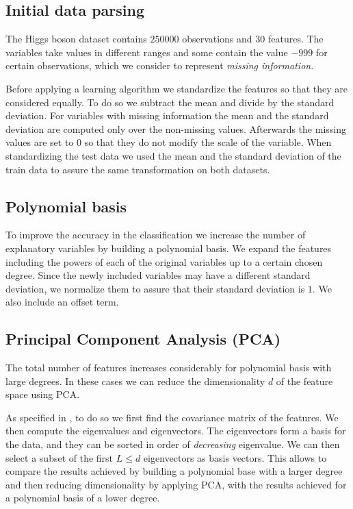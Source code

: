 \documentclass[10pt,conference,compsocconf]{IEEEtran}
\begin{document}
	\subsection{Initial data parsing} %
	\label{sub:initial_data_parsing}
  	The Higgs boson dataset contains $250000$ observations and $30$ features. The variables take values in different ranges and some contain the value $-999$ for certain observations, which we consider to represent \emph{missing information}. %

  	Before applying a learning algorithm we standardize the features so that they are considered equally. To do so we subtract the mean and divide by the standard deviation. For variables with missing information the mean and the standard deviation are computed only over the non-missing values. Afterwards the missing values are set to $0$ so that they do not modify the scale of the variable. When standardizing the test data we used the mean and the standard deviation of the train data to assure the same transformation on both datasets.%

	\subsection{Polynomial basis} %
	\label{sub:polynomial_basis}
  	To improve the accuracy in the classification we increase the number of explanatory variables by building a polynomial basis. We expand the features including the powers of each of the original variables up to a certain chosen degree. Since the newly included variables may have a different standard deviation, we normalize them to assure that their standard deviation is $1$. We also include an offset term.

	\subsection{Principal Component Analysis (PCA)} %
	\label{sub:principal_component_analysis}
  	The total number of features increases considerably for polynomial basis with large degrees. In these cases we can reduce the dimensionality $d$ of the feature space using PCA.

  	As specified in \cite{smith02}, to do so we first find the covariance matrix of the features. We then compute the eigenvalues and eigenvectors. The eigenvectors form a basis for the data, and they can be sorted in order of \emph{decreasing} eigenvalue. We can then select a subset of the first $L\leq d$ eigenvectors as basis vectors. This allows to compare the results achieved by building a polynomial base with a larger degree and then reducing dimensionality by applying PCA, with the results achieved for a polynomial basis of a lower degree.
\end{document}
